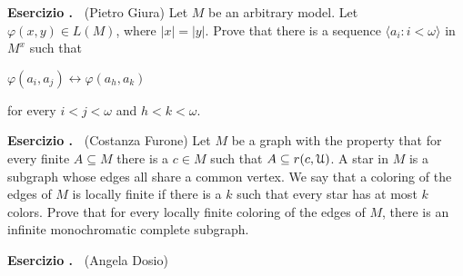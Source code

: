 \documentclass[10pt]{article}
\def\phi{\varphi}
\def\U{\EuScript U}
\def\iff{\leftrightarrow}
\newcounter{ex}
\newenvironment{exercise}{\bigskip\addtocounter{ex}{1}\textbf{Esercizio \theex.\ }}{}
\begin{document}
\begin{exercise}
  (Pietro Giura)
  Let $M$ be an arbitrary model.
  Let $\phi(x,y)\in L(M)$, where $|x|=|y|$.
  Prove that there is a sequence $\langle a_i:i<\omega\rangle$ in $M^{x}$ such that

  \hfil$\phi(a_i,a_j)\iff\phi(a_h,a_k)$

  for every $i<j<\omega$ and $h<k<\omega$.
\end{exercise}

\begin{exercise} 
  (Costanza Furone)
  Let $M$ be a graph with the property that for every finite $A\subseteq M$ there is a $c\in M$ such that $A\subseteq r(c,\U)$. 
  A star in $M$ is a subgraph whose edges all share a common vertex. We say that a coloring of the edges of $M$ is locally finite if there is a $k$ such that every star has at most $k$ colors.
  Prove that for every locally finite coloring of the edges of $M$, there is an infinite monochromatic complete subgraph.
\end{exercise}

\begin{exercise}
  (Angela Dosio)
\end{exercise}
  
\end{document}
